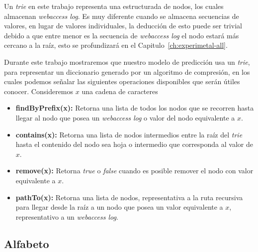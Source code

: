 Un \emph{trie} en este trabajo representa una estructurada de nodos, los cuales almacenan \emph{webaccess log}.  Es muy diferente cuando se almacena secuencias de valores, en lugar de valores individuales, la deducción de esto puede ser trivial debido a que entre menor es la secuencia de \emph{webaccess log} el nodo estará más cercano a la raíz, esto se profundizará en el Capitulo~\ref{ch:experimetal-all}. %


Durante este trabajo mostraremos que nuestro modelo de predicción usa un \emph{trie}, para representar un diccionario generado por un algoritmo de compresión, en los cuales podemos señalar las siguientes operaciones disponibles que serán útiles conocer. Consideremos $x$ una cadena de caracteres

	\begin{itemize}	
		\item \textbf{findByPrefix(x):}  Retorna una lista de todos los nodos 	que se recorren hasta llegar al nodo que posea un \emph{webaccess log} o valor del nodo  equivalente a $x$.
		
		\item \textbf{contains(x):} Retorna una lista de nodos intermedios entre la raíz del \emph{trie} hasta el contenido del nodo sea hoja o intermedio que corresponda al valor de $x$.
		
		\item \textbf{remove(x):} Retorna \emph{true} o \emph{false} cuando es posible remover el nodo con valor equivalente a $x$.
		
		\item \textbf{pathTo(x):} Retorna una lista de nodos, representativa a la ruta recursiva para llegar desde la raíz a un nodo que posea un valor equivalente a $x$, representativo a un \emph{webaccess log}.
	\end{itemize}







\subsection{Alfabeto} \label{concept-alphabet}


